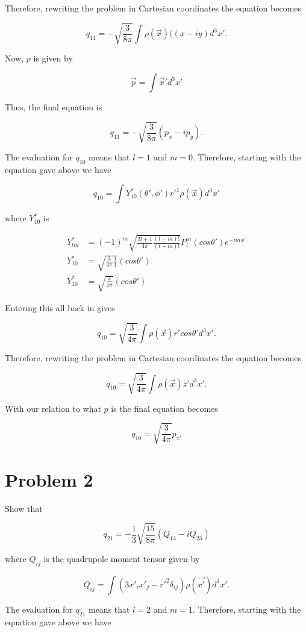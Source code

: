 \documentclass[11pt]{article}
\begin{document}
Therefore, rewriting the problem in Cartesian coordinates the equation becomes

$$
q_{11} = -\sqrt{\frac{3}{8\pi}} \int \rho(\vec{x})((x - iy) d^{3}x'.
$$

Now, $p$ is given by

$$
\vec{p} = \int \vec{x}'d^{3}x'
$$

Thus, the final equation is

$$
q_{11} = -\sqrt{\frac{3}{8\pi}}(p_{x} - ip_{y}).
$$

The evaluation for $q_{10}$ means that $l = 1$ and $m = 0$. Therefore, starting with the equation gave above we have

$$
q_{10} = \int Y^{*}_{10}(\theta', \phi') r'^{1} \rho(\vec{x}) d^{3}x'
$$

where $Y^{*}_{10}$ is 

\begin{align*}
Y^{*}_{lm} &= (-1)^{m} \sqrt{\frac{2l+1}{4\pi}\frac{(l-m)!}{(l+m)!}} P_{l}^{m}(cos\theta')e^{-im\phi'} \\
Y^{*}_{10} &= \sqrt{\frac{3}{4\pi}\frac{1}{1}} (cos\theta') \\ 
Y^{*}_{10} &= \sqrt{\frac{3}{4\pi}} (cos\theta') 
\end{align*}

Entering this all back in gives 

$$
q_{10} = \sqrt{\frac{3}{4\pi}} \int \rho(\vec{x}) r' cos\theta' d^{3}x'.
$$

Therefore, rewriting the problem in Cartesian coordinates the equation becomes

$$
q_{10} = \sqrt{\frac{3}{4\pi}} \int \rho(\vec{x}) z' d^{3}x'.
$$

With our relation to what $p$ is the final equation becomes

$$
q_{10} = \sqrt{\frac{3}{4\pi}}p_{z}.
$$


\clearpage

\section*{Problem 2}

Show that 

$$
q_{21} = -\frac{1}{3}\sqrt{\frac{15}{8\pi}}(Q_{13}-iQ_{23})
$$

where $Q_{ij}$ is the quadrupole moment tensor given by

$$
Q_{ij} = \int (3x'_{i}x'_{j}-r'^{2}\delta_{ij})\rho(\vec{x'})d^{3}x'.
$$

The evaluation for $q_{21}$ means that $l = 2$ and $m = 1$. Therefore, starting with the equation gave above we have
\end{document}
